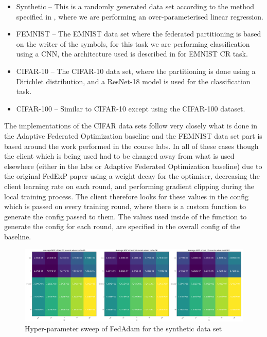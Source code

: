 \documentclass{article}
\begin{document}
\begin{itemize}
    \item Synthetic -- This is a randomly generated data set according to the method specified in \cite{syntheticDatasetGeneration}, where we are performing an over-parameterised linear regression.
    \item FEMNIST -- The EMNIST data set where the federated partitioning is based on the writer of the symbols, for this task we are performing classification using a CNN, the architecture used is described in \cite{AdaptiveFederatedOptimisation} for EMNIST CR task.
    \item CIFAR-10 -- The CIFAR-10 data set, where the partitioning is done using a Dirichlet distribution, and a ResNet-18 model \cite{ResNet} is used for the classification task.
    \item CIFAR-100 -- Similar to CIFAR-10 except using the CIFAR-100 dataset.
\end{itemize}

The implementations of the CIFAR data sets follow very closely what is done in the Adaptive Federated Optimization baseline and the FEMNIST data set part is based around the work performed in the course labs.  In all of these cases though the client which is being used had to be changed away from what is used elsewhere (either in the labs or Adaptive Federated Optimization baseline) due to the original FedExP paper \cite{FedExP} using a weight decay for the optimiser, decreasing the client learning rate on each round, and performing gradient clipping during the local training process.  The client therefore looks for these values in the config which is passed on every training round, where there is a custom function to generate the config passed to them.  The values used inside of the function to generate the config for each round, are specified in the overall config of the baseline.

\begin{figure}
    \centerline{\includegraphics[width=\linewidth]{figs/fedAdamSyntheticHyperpameterTuning.pdf}}
    \caption{Hyper-parameter sweep of FedAdam for the synthetic data set}
    \label{fig:fedAdamSweep}
\end{figure}
\end{document}
